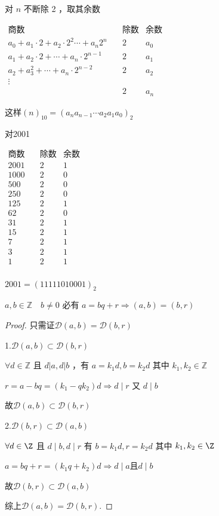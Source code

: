 \begin{solution}
	对 $n$ 不断除 2 ，取其余数
	
	$\begin{aligned}
		\textbf{商数}\quad&\textbf{除数}&\textbf{余数}\\
		a_0+a_1 \cdot 2+a_2 \cdot 2^2 \cdots+a_n 2^n\quad&2&a_0\\
		a_1+a_2 \cdot 2+\cdots+a_n \cdot 2^{n-1} \quad &2&a_1\\
		a_2+a_3^2+\cdots+a_n \cdot 2^{n-2} \quad&2&a_2\\
		\vdots\\
		\quad&2&a_n
	\end{aligned}$
	
	这样$(n)_{10}=\left(a_n a_{n-1} \cdots a_2 a_1 a_0\right)_2$
	
	对2001
	
	$\begin{aligned}
		\textbf{商数}\quad&\textbf{除数}&\textbf{余数}\\
		2001\quad&2&1\\
		1000\quad&2&0\\
		500 \quad &2&0\\
		250\quad&2&0\\
		125\quad&2&1\\
		62\quad&2&0\\
		31\quad&2&1\\
		15\quad&2&1\\
		7\quad&2&1\\
		3\quad&2&1\\
		1\quad&2&1\\
	\end{aligned}$
	
	$2001=(11111010001)_2$
\end{solution}
\begin{lemma}
	$ a, b \in \mathbb{Z} \quad b \neq 0 \text { 必有 } a=b q+r \Rightarrow(a, b)=(b, r)$
\end{lemma}
\begin{proof}
	只需证$\mathscr{D}(a,b)=\mathscr{D}(b,r)$
	
	1.$\mathscr{D}(a,b)\subset\mathscr{D}(b,r)$
	
	$\forall d \in \mathbb{Z}$ 且 $d|a, d| b$ ，有 $a=k_1 d , b = k_2 d$ 其中 $k_1, k_2 \in \mathbb{Z}$
	
	$ r=a-b q=\left(k_1-q k_2\right) d \Rightarrow d \mid r$ 又 $d \mid b$
	
	故$\mathscr{D}(a,b)\subset\mathscr{D}(b,r)$
	
	2.$\mathscr{D}(b,r)\subset\mathscr{D}(a,b)$
	
	$\forall d \in \Z$ 且 $d\mid b, d\mid r$ 有 $b=k_1 d , r=k_2 d$ 其中 $k_1, k_2 \in\Z$
	
	$ a=b q+r=\left(k_1 q+k_2\right) d \Rightarrow d \mid a $且$ d \mid b$
	
	故$\mathscr{D}(b,r)\subset\mathscr{D}(a,b)$
	
	综上$\mathscr{D}(a,b)=\mathscr{D}(b,r)$.
\end{proof}

